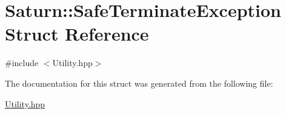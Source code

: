 \hypertarget{struct_saturn_1_1_safe_terminate_exception}{}\section{Saturn\+:\+:Safe\+Terminate\+Exception Struct Reference}
\label{struct_saturn_1_1_safe_terminate_exception}


{\ttfamily \#include $<$Utility.\+hpp$>$}



The documentation for this struct was generated from the following file\+:\begin{DoxyCompactItemize}
\item 
\mbox{\hyperlink{_utility_8hpp}{Utility.\+hpp}}\end{DoxyCompactItemize}
